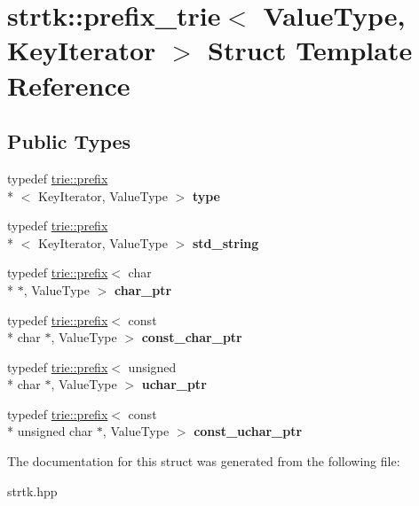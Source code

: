\hypertarget{structstrtk_1_1prefix__trie}{\section{strtk\-:\-:prefix\-\_\-trie$<$ Value\-Type, Key\-Iterator $>$ Struct Template Reference}
\label{structstrtk_1_1prefix__trie}
}
\subsection*{Public Types}
\begin{DoxyCompactItemize}
\item 
\hypertarget{structstrtk_1_1prefix__trie_a3b8576c6c1e6c258ad45da3ddec60171}{typedef \hyperlink{classstrtk_1_1trie_1_1prefix}{trie\-::prefix}\\*
$<$ Key\-Iterator, Value\-Type $>$ {\bfseries type}}\label{structstrtk_1_1prefix__trie_a3b8576c6c1e6c258ad45da3ddec60171}

\item 
\hypertarget{structstrtk_1_1prefix__trie_aed3fc66a7fe65ffa4c0fe4c40e800bf0}{typedef \hyperlink{classstrtk_1_1trie_1_1prefix}{trie\-::prefix}\\*
$<$ Key\-Iterator, Value\-Type $>$ {\bfseries std\-\_\-string}}\label{structstrtk_1_1prefix__trie_aed3fc66a7fe65ffa4c0fe4c40e800bf0}

\item 
\hypertarget{structstrtk_1_1prefix__trie_a1a33be4fe30aa3fcf46d4d48724c8a82}{typedef \hyperlink{classstrtk_1_1trie_1_1prefix}{trie\-::prefix}$<$ char \\*
$\ast$, Value\-Type $>$ {\bfseries char\-\_\-ptr}}\label{structstrtk_1_1prefix__trie_a1a33be4fe30aa3fcf46d4d48724c8a82}

\item 
\hypertarget{structstrtk_1_1prefix__trie_ae65e4c315ef9582c41f3f7269d7defee}{typedef \hyperlink{classstrtk_1_1trie_1_1prefix}{trie\-::prefix}$<$ const \\*
char $\ast$, Value\-Type $>$ {\bfseries const\-\_\-char\-\_\-ptr}}\label{structstrtk_1_1prefix__trie_ae65e4c315ef9582c41f3f7269d7defee}

\item 
\hypertarget{structstrtk_1_1prefix__trie_a1169ae7eceefc8220dea284354d82bc7}{typedef \hyperlink{classstrtk_1_1trie_1_1prefix}{trie\-::prefix}$<$ unsigned \\*
char $\ast$, Value\-Type $>$ {\bfseries uchar\-\_\-ptr}}\label{structstrtk_1_1prefix__trie_a1169ae7eceefc8220dea284354d82bc7}

\item 
\hypertarget{structstrtk_1_1prefix__trie_a29816064f1519e463a38ee81c1d037fc}{typedef \hyperlink{classstrtk_1_1trie_1_1prefix}{trie\-::prefix}$<$ const \\*
unsigned char $\ast$, Value\-Type $>$ {\bfseries const\-\_\-uchar\-\_\-ptr}}\label{structstrtk_1_1prefix__trie_a29816064f1519e463a38ee81c1d037fc}

\end{DoxyCompactItemize}


The documentation for this struct was generated from the following file\-:\begin{DoxyCompactItemize}
\item 
strtk.\-hpp\end{DoxyCompactItemize}
